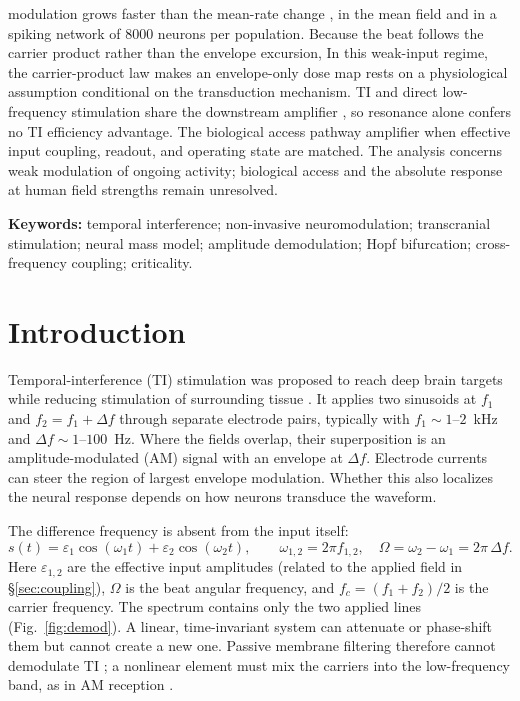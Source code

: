 \documentclass[11pt,a4paper]{article}
\providecommand{\DIFaddtex}[1]{{\protect\color{blue} \sf #1}} %
\providecommand{\DIFdeltex}[1]{{\protect\color{red} \scriptsize #1}} %
\providecommand{\DIFaddbegin}{} %
\providecommand{\DIFaddend}{} %
\providecommand{\DIFdelbegin}{} %
\providecommand{\DIFdelend}{} %
\providecommand{\DIFadd}[1]{\texorpdfstring{\DIFaddtex{#1}}{#1}} %
\providecommand{\DIFdel}[1]{\texorpdfstring{\DIFdeltex{#1}}{}} %
\begin{document}
modulation grows faster than the mean-rate change \DIFdelbegin \DIFdel{, }\DIFdelend in the mean field and in a spiking
network of $8000$ neurons per population. \DIFdelbegin \DIFdel{Because the beat follows the carrier product rather than the
envelope excursion, }\DIFdelend \DIFaddbegin \DIFadd{In this weak-input regime, the carrier-product
law makes }\DIFaddend an envelope-only dose map \DIFdelbegin \DIFdel{rests on a physiological assumption}\DIFdelend \DIFaddbegin \DIFadd{conditional on the transduction mechanism}\DIFaddend . TI and
direct low-frequency stimulation share the \DIFdelbegin \DIFdel{downstream amplifier , so resonance alone
confers no TI efficiency advantage. The biological access pathway }\DIFdelend \DIFaddbegin \DIFadd{amplifier when effective input coupling,
readout, and operating state are matched. The analysis concerns weak modulation of
ongoing activity; biological access }\DIFaddend and the absolute response at human field strengths
remain unresolved.
\fi

\smallskip
\noindent\textbf{Keywords:} temporal interference; non-invasive neuromodulation;
transcranial stimulation; neural mass model; amplitude demodulation; Hopf bifurcation;
cross-frequency coupling; criticality.

\clearpage
\tableofcontents
\clearpage

\section{Introduction}
Temporal-interference (TI) stimulation was proposed to reach deep brain targets while
reducing stimulation of surrounding tissue \cite{grossman2017}. It applies two sinusoids at
$f_1$ and $f_2=f_1+\Delta f$ through separate electrode pairs, typically with
$f_1\sim1$--$2$~kHz and $\Delta f\sim1$--$100$~Hz. Where the fields overlap, their
superposition is an amplitude-modulated (AM) signal with an envelope at $\Delta f$.
Electrode currents can steer the region of largest envelope modulation. Whether this
also localizes the neural response depends on how neurons transduce the waveform.

The difference frequency is absent from the input itself:
\begin{equation}
s(t)=\varepsilon_1\cos(\omega_1 t)+\varepsilon_2\cos(\omega_2 t),\qquad
\omega_{1,2}=2\pi f_{1,2},\quad \Omega=\omega_2-\omega_1=2\pi\,\Delta f .
\label{eq:am}
\end{equation}
Here $\varepsilon_{1,2}$ are the effective input amplitudes (related to the applied field
in \S\ref{sec:coupling}), $\Omega$ is the beat angular frequency, and
$f_c=(f_1+f_2)/2$ is the carrier frequency. The spectrum contains only the two applied
lines (Fig.~\ref{fig:demod}). A linear, time-invariant system can attenuate or phase-shift
them but cannot create a new one. Passive membrane filtering therefore cannot
demodulate TI \cite{mirzakhalili2020}; a nonlinear element must mix the carriers into
the low-frequency band, as in AM reception \cite{nahin2001}.
\end{document}
